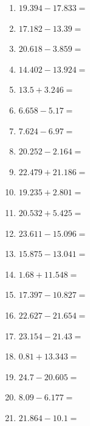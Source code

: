 \documentclass[12pt]{article}
\begin{document}
\begin{enumerate}
\item \large $ 19.394 - 17.833 = $ \vspace{1.5cm}
\newpage
\item \large $ 17.182 - 13.39 = $ \vspace{1.5cm}
\item \large $ 20.618 - 3.859 = $ \vspace{1.5cm}
\item \large $ 14.402 - 13.924 = $ \vspace{1.5cm}
\item \large $ 13.5 + 3.246 = $ \vspace{1.5cm}
\item \large $ 6.658 - 5.17 = $ \vspace{1.5cm}
\item \large $ 7.624 - 6.97 = $ \vspace{1.5cm}
\item \large $ 20.252 - 2.164 = $ \vspace{1.5cm}
\item \large $ 22.479 + 21.186 = $ \vspace{1.5cm}
\item \large $ 19.235 + 2.801 = $ \vspace{1.5cm}
\item \large $ 20.532 + 5.425 = $ \vspace{1.5cm}
\newpage
\item \large $ 23.611 - 15.096 = $ \vspace{1.5cm}
\item \large $ 15.875 - 13.041 = $ \vspace{1.5cm}
\item \large $ 1.68 + 11.548 = $ \vspace{1.5cm}
\item \large $ 17.397 - 10.827 = $ \vspace{1.5cm}
\item \large $ 22.627 - 21.654 = $ \vspace{1.5cm}
\item \large $ 23.154 - 21.43 = $ \vspace{1.5cm}
\item \large $ 0.81 + 13.343 = $ \vspace{1.5cm}
\item \large $ 24.7 - 20.605 = $ \vspace{1.5cm}
\item \large $ 8.09 - 6.177 = $ \vspace{1.5cm}
\item \large $ 21.864 - 10.1 = $ \vspace{1.5cm}

\end{enumerate}
\end{document}
